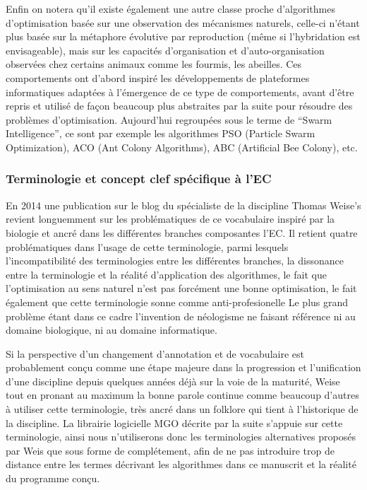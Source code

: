 Enfin on notera qu'il existe également une autre classe proche d'algorithmes d'optimisation basée sur une observation des mécanismes naturels, celle-ci n'étant plus basée sur la métaphore évolutive par reproduction (même si l'hybridation est envisageable), mais sur les capacités d'organisation et d'auto-organisation observées chez certains animaux comme les fourmis, les abeilles. Ces comportements ont d'abord inspiré les développements de plateformes informatiques adaptées à l'émergence de ce type de comportements, avant d'être repris et utilisé de façon beaucoup plus abstraites par la suite pour résoudre des problèmes d'optimisation. Aujourd'hui regroupées sous le terme de \foreignquote{english}{Swarm Intelligence}, ce sont par exemple les algorithmes PSO (Particle Swarm Optimization), ACO (Ant Colony Algorithms), ABC (Artificial Bee Colony), etc.


\subsubsection{Terminologie et concept clef spécifique à l'EC}

En 2014 une publication sur le blog du spécialiste de la discipline Thomas Weise's  revient longuemment sur les problématiques de ce vocabulaire inspiré par la biologie et ancré dans les différentes branches composantes l'EC. Il retient quatre problématiques dans l'usage de cette terminologie, parmi lesquels l'incompatibilité des terminologies entre les différentes branches, la dissonance entre la terminologie et la réalité d'application des algorithmes, le fait que l'optimisation au sens naturel n'est pas forcément une bonne optimisation,  le fait également que cette terminologie sonne comme anti-profesionelle  Le plus grand problème étant dans ce cadre l'invention de néologisme ne faisant référence ni au domaine biologique, ni au domaine informatique.

Si la perspective d'un changement d'annotation et de vocabulaire est probablement conçu comme une étape majeure dans la progression et l'unification d'une discipline depuis quelques années déjà sur la voie de la maturité, Weise tout en pronant au maximum la bonne parole continue comme beaucoup d'autres à utiliser cette terminologie, très ancré dans un folklore qui tient à l'historique de la discipline. La librairie logicielle MGO décrite par la suite s'appuie sur cette terminologie, ainsi nous n'utiliserons donc les terminologies alternatives proposés par Weis que sous forme de complétement, afin de ne pas introduire trop de distance entre les termes décrivant les algorithmes dans ce manuscrit et la réalité du programme conçu.


